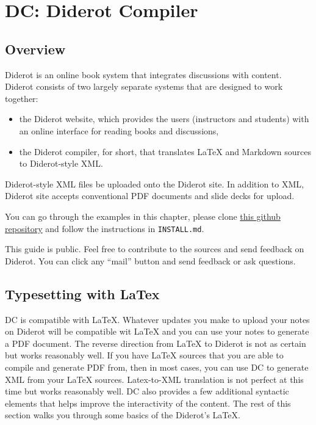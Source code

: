 \chapter{DC: Diderot Compiler}
\label{mtl}
 

\section{Overview}

Diderot is an online book system that integrates discussions with
content.  Diderot consists of two largely separate systems that are
designed to work together:
%
\begin{itemize}
\item the Diderot website, which
provides the users (instructors and students) with an online interface
for reading books and discussions, 
\item the Diderot
compiler,  for short, that translates LaTeX and Markdown
sources to Diderot-style XML.
\end{itemize}
%
Diderot-style XML files be uploaded onto the Diderot site. 
%
In addition to XML, Diderot site accepts conventional PDF documents
and slide decks for upload. 
%


\begin{important}
You can go through the examples in this chapter, please clone 
%
\href{https://github.com/diderot-edu/guide}{this github repository}
%
and follow the instructions in \lstinline`INSTALL.md`. 

This guide is public.  Feel free to contribute to the sources and send feedback on Diderot.  You can click any ``mail'' button and send feedback or ask questions. 
\end{important}



\section{Typesetting with LaTex}

DC is compatible with LaTeX. Whatever updates you make to upload your notes on Diderot will be compatible wit LaTeX and you can use your notes to generate a PDF document.
%
The reverse direction from LaTeX to Diderot is not as certain but works reasonably well.
%
If you have  LaTeX sources that you are able to compile and generate PDF from, then in most cases, you can use DC to generate XML from your LaTeX sources.  
%
Latex-to-XML translation is not perfect at this time but works reasonably well. 
%
DC also provides a few additional syntactic elements that helps improve the interactivity of the content.  
%
The rest of this section walks you through some basics of the Diderot's LaTeX.

